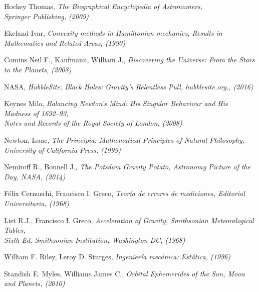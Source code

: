 \documentclass[a4paper,twocolumn]{article}
\begin{document}
\begin{thebibliography}{99}

     Hockey Thomas, \emph{The Biographical Encyclopedia of Astronomers,\\ Springer Publishing, (2009)}

     Ekeland Ivar, \emph{Convexity methods in Hamiltonian mechanics, Results in Mathematics and Related Areas, (1990)}

     Comins Neil F., Kaufmann, William J., \emph{Discovering the Universe: From the Stars to the Planets, (2008)}

     NASA, \emph{HubbleSite: Black Holes: Gravity's Relentless Pull, hubblesite.org., (2016)}

     Keynes Milo, \emph{Balancing Newton's Mind: His Singular Behaviour and His Madness of 1692--93,\\ Notes and Records of the Royal Society of London, (2008)}

     Newton, Isaac, \emph{The Principia: Mathematical Principles of Natural Philosophy, University of California Press, (1999)}

     Nemiroff R., Bonnell J., \emph{The Potsdam Gravity Potato, Astronomy Picture of the Day, NASA, (2014)}

     Félix Cernuschi, Francisco I. Greco, \emph{Teoría de errores de mediciones, Editorial Universitaria, (1968)}

     List R.J., Francisco I. Greco, \emph{Acceleration of Gravity, Smithsonian Meteorological Tables,\\ Sixth Ed. Smithsonian Institution, Washington DC, (1968)}

     William F. Riley, Leroy D. Sturges, \emph{Ingeniería mecánica: Estática, (1996)}

     Standish E. Myles, Williams James C., \emph{Orbital Ephemerides of the Sun, Moon and Planets, (2010)}

\end{thebibliography}
\newpage





\end{document}
